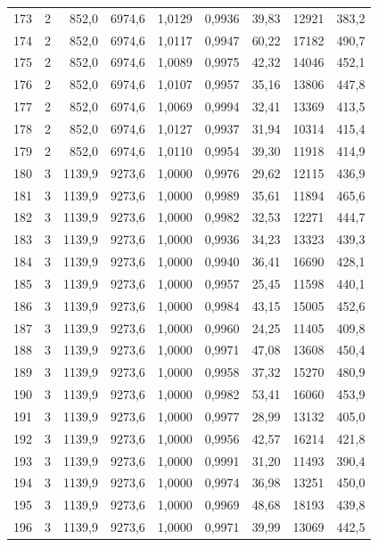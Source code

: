 \documentclass[11pt,a4paper]{article}
\begin{document}
{\begin{longtable}{r c r r r r r r r}
173 & 2 & 852,0 & 6974,6 & 1,0129 & 0,9936 & 39,83 & 12921 & 383,2 \\
174 & 2 & 852,0 & 6974,6 & 1,0117 & 0,9947 & 60,22 & 17182 & 490,7 \\
175 & 2 & 852,0 & 6974,6 & 1,0089 & 0,9975 & 42,32 & 14046 & 452,1 \\
176 & 2 & 852,0 & 6974,6 & 1,0107 & 0,9957 & 35,16 & 13806 & 447,8 \\
177 & 2 & 852,0 & 6974,6 & 1,0069 & 0,9994 & 32,41 & 13369 & 413,5 \\
178 & 2 & 852,0 & 6974,6 & 1,0127 & 0,9937 & 31,94 & 10314 & 415,4 \\
179 & 2 & 852,0 & 6974,6 & 1,0110 & 0,9954 & 39,30 & 11918 & 414,9 \\
180 & 3 & 1139,9 & 9273,6 & 1,0000 & 0,9976 & 29,62 & 12115 & 436,9 \\
181 & 3 & 1139,9 & 9273,6 & 1,0000 & 0,9989 & 35,61 & 11894 & 465,6 \\
182 & 3 & 1139,9 & 9273,6 & 1,0000 & 0,9982 & 32,53 & 12271 & 444,7 \\
183 & 3 & 1139,9 & 9273,6 & 1,0000 & 0,9936 & 34,23 & 13323 & 439,3 \\
184 & 3 & 1139,9 & 9273,6 & 1,0000 & 0,9940 & 36,41 & 16690 & 428,1 \\
185 & 3 & 1139,9 & 9273,6 & 1,0000 & 0,9957 & 25,45 & 11598 & 440,1 \\
186 & 3 & 1139,9 & 9273,6 & 1,0000 & 0,9984 & 43,15 & 15005 & 452,6 \\
187 & 3 & 1139,9 & 9273,6 & 1,0000 & 0,9960 & 24,25 & 11405 & 409,8 \\
188 & 3 & 1139,9 & 9273,6 & 1,0000 & 0,9971 & 47,08 & 13608 & 450,4 \\
189 & 3 & 1139,9 & 9273,6 & 1,0000 & 0,9958 & 37,32 & 15270 & 480,9 \\
190 & 3 & 1139,9 & 9273,6 & 1,0000 & 0,9982 & 53,41 & 16060 & 453,9 \\
191 & 3 & 1139,9 & 9273,6 & 1,0000 & 0,9977 & 28,99 & 13132 & 405,0 \\
192 & 3 & 1139,9 & 9273,6 & 1,0000 & 0,9956 & 42,57 & 16214 & 421,8 \\
193 & 3 & 1139,9 & 9273,6 & 1,0000 & 0,9991 & 31,20 & 11493 & 390,4 \\
194 & 3 & 1139,9 & 9273,6 & 1,0000 & 0,9974 & 36,98 & 13251 & 450,0 \\
195 & 3 & 1139,9 & 9273,6 & 1,0000 & 0,9969 & 48,68 & 18193 & 439,8 \\
196 & 3 & 1139,9 & 9273,6 & 1,0000 & 0,9971 & 39,99 & 13069 & 442,5 \\

\end{longtable}}
\end{document}
